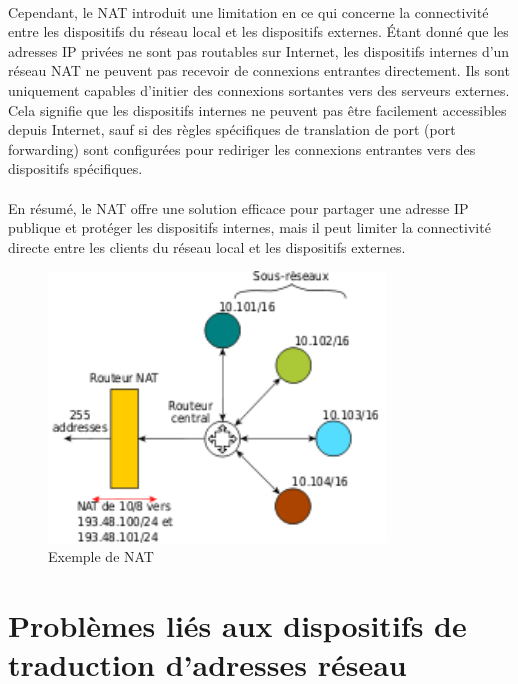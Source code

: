 \paragraph{}
Cependant, le NAT introduit une limitation en ce qui concerne la connectivité entre les dispositifs du réseau local et les dispositifs externes. Étant donné que les adresses IP privées ne sont pas routables sur Internet, 
les dispositifs internes d'un réseau NAT ne peuvent pas recevoir de connexions entrantes directement. Ils sont uniquement capables d'initier des connexions sortantes vers des serveurs externes. Cela signifie que les dispositifs 
internes ne peuvent pas être facilement accessibles depuis Internet, sauf si des règles spécifiques de translation de port (port forwarding) sont configurées pour rediriger les connexions entrantes vers des dispositifs spécifiques.

\paragraph{}
En résumé, le NAT offre une solution efficace pour partager une adresse IP publique et protéger les dispositifs internes, mais il peut limiter la connectivité directe entre les clients du réseau local et les dispositifs externes.


\begin{figure}[h]
\centering
\includegraphics[width=0.8\textwidth]{assets/nat.png}
\caption{Exemple de NAT}
\end{figure}

\newpage

\section{Problèmes liés aux dispositifs de traduction d'adresses réseau}


